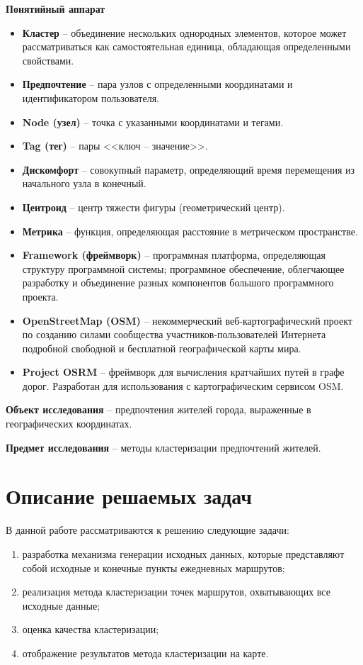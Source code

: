 \textbf{Понятийный аппарат}
\vspace*{-1em}
\begin{itemize}\itemsep-5pt
    \item \textbf{Кластер} -- объединение нескольких однородных элементов,
        которое может рассматриваться как самостоятельная единица, обладающая
        определенными свойствами.
    \item \textbf{Предпочтение} -- пара узлов с определенными координатами
        и идентификатором пользователя.
    \item \textbf{Node (узел)} -- точка с указанными координатами и тегами.
    \item \textbf{Tag (тег)} -- пары <<ключ -- значение>>.
    \item \textbf{Дискомфорт} -- совокупный параметр, определяющий время
        перемещения из начального узла в конечный.
    \item \textbf{Центроид} -- центр тяжести фигуры (геометрический центр).
    \item \textbf{Метрика} -- функция, определяющая расстояние в
        метрическом пространстве.
    \item \textbf{Framework (фреймворк)} -- программная платформа, определяющая структуру
        программной системы; программное обеспечение, облегчающее разработку и объединение разных
        компонентов большого программного проекта.
    \item \textbf{OpenStreetMap (OSM)} -- некоммерческий веб-картографический проект по созданию
        силами сообщества участников-пользователей Интернета подробной свободной и бесплатной
        географической карты мира.
    \item \textbf{Project OSRM} -- фреймворк для вычисления кратчайших путей в графе дорог.
        Разработан для использования с картографическим сервисом OSM.
\end{itemize}

\textbf{Объект исследования} -- предпочтения жителей города, выраженные
    в географических координатах.

\textbf{Предмет исследования} -- методы кластеризации предпочтений жителей.

\chapter{Описание решаемых задач}
В данной работе рассматриваются к решению следующие задачи:
\begin{enumerate}\itemsep-5pt
    \item разработка механизма генерации исходных данных, которые представляют собой исходные и
        конечные пункты ежедневных маршрутов;
    \item реализация метода кластеризации точек маршрутов, охватывающих все исходные данные;
    \item оценка качества кластеризации;
    \item отображение результатов метода кластеризации на карте.
\end{enumerate}


